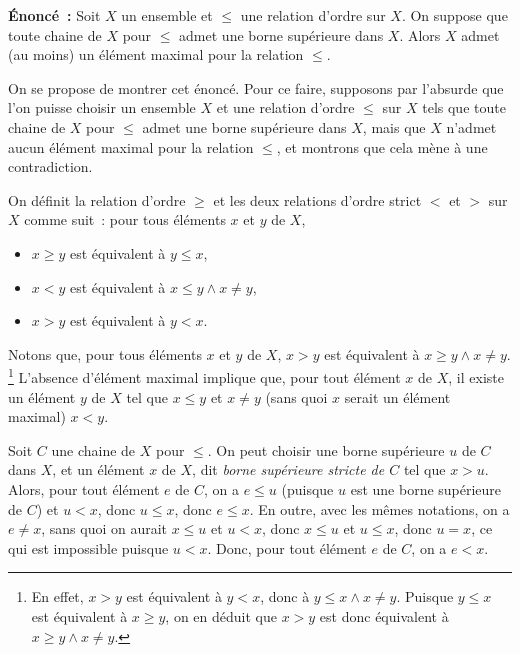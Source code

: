 \medskip

\noindent\textbf{Énoncé :} Soit $X$ un ensemble et $\leq$ une relation d'ordre sur $X$.
    On suppose que toute chaine de $X$ pour $\leq$ admet une borne supérieure dans $X$.
    Alors $X$ admet (au moins) un élément maximal pour la relation $\leq$.

\medskip

On se propose de montrer cet énoncé. 
Pour ce faire, supposons par l'absurde que l'on puisse choisir un ensemble $X$ et une relation d'ordre $\leq$ sur $X$ tels que toute chaine de $X$ pour $\leq$ admet une borne supérieure dans $X$, mais que $X$ n'admet aucun élément maximal pour la relation $\leq$, et montrons que cela mène à une contradiction. 

On définit la relation d'ordre $\geq$ et les deux relations d'ordre strict $<$ et $>$ sur $X$ comme suit : pour tous éléments $x$ et $y$ de $X$, 
\begin{itemize}[nosep]
    \item $x \geq y$ est équivalent à $y \leq x$,
    \item $x < y$ est équivalent à $x \leq y \wedge x \neq y$,
    \item $x > y$ est équivalent à $y < x$.
\end{itemize}
Notons que, pour tous éléments $x$ et $y$ de $X$, $x > y$ est équivalent à $x \geq y \wedge x \neq y$.%
\footnote{
    En effet, $x > y$ est équivalent à $y < x$, donc à $y \leq x \wedge x \neq y$. 
    Puisque $y \leq x$ est équivalent à $x \geq y$, on en déduit que $x > y$ est donc équivalent à $x \geq y \wedge x \neq y$.
}
L'absence d'élément maximal implique que, pour tout élément $x$ de $X$, il existe un élément $y$ de $X$ tel que $x \leq y$ et $x \neq y$ (sans quoi $x$ serait un élément maximal) $x < y$.

\medskip

Soit $C$ une chaine de $X$ pour $\leq$. 
On peut choisir une borne supérieure $u$ de $C$ dans $X$, et un élément $x$ de $X$, dit \textit{borne supérieure stricte de $C$} tel que $x > u$. 
Alors, pour tout élément $e$ de $C$, on a $e \leq u$ (puisque $u$ est une borne supérieure de $C$) et $u < x$, donc $u \leq x$, donc $e \leq x$.
En outre, avec les mêmes notations, on a $e \neq x$, sans quoi on aurait $x \leq u$ et $u < x$, donc $x \leq u$ et $u \leq x$, donc $u = x$, ce qui est impossible puisque $u < x$. 
Donc, pour tout élément $e$ de $C$, on a $e < x$. 

